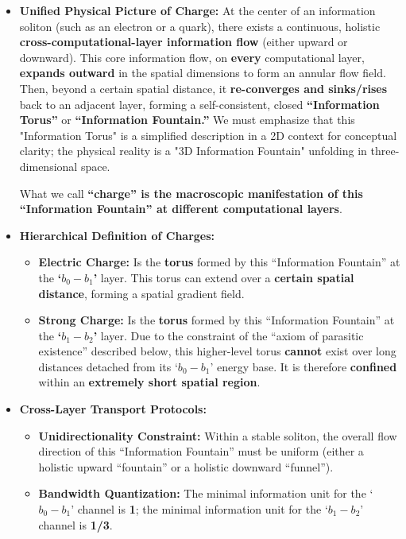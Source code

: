 \documentclass[11pt, a4paper]{article}
\begin{document}
\begin{itemize}
    \item \textbf{Unified Physical Picture of Charge:}  
    At the center of an information soliton (such as an electron or a quark), there exists a continuous, holistic \textbf{cross-computational-layer information flow} (either upward or downward). This core information flow, on \textbf{every} computational layer, \textbf{expands outward} in the spatial dimensions to form an annular flow field. Then, beyond a certain spatial distance, it \textbf{re-converges and sinks/rises} back to an adjacent layer, forming a self-consistent, closed \textbf{``Information Torus''} or \textbf{``Information Fountain.''} We must emphasize that this "Information Torus" is a simplified description in a 2D context for conceptual clarity; the physical reality is a "3D Information Fountain" unfolding in three-dimensional space.
    
    What we call \textbf{``charge'' is the macroscopic manifestation of this ``Information Fountain'' at different computational layers}.
    
    \item \textbf{Hierarchical Definition of Charges:}
    \begin{itemize}
        \item \textbf{Electric Charge:} Is the \textbf{torus} formed by this ``Information Fountain'' at the \textbf{`$b_0-b_1$'} layer. This torus can extend over a \textbf{certain spatial distance}, forming a spatial gradient field.
    
        \item \textbf{Strong Charge:} Is the \textbf{torus} formed by this ``Information Fountain'' at the \textbf{`$b_1-b_2$'} layer. Due to the constraint of the ``axiom of parasitic existence'' described below, this higher-level torus \textbf{cannot} exist over long distances detached from its `$b_0-b_1$' energy base. It is therefore \textbf{confined} within an \textbf{extremely short spatial region}.
    \end{itemize}
    
    \item \textbf{Cross-Layer Transport Protocols:}
    \begin{itemize}
        \item \textbf{Unidirectionality Constraint:} Within a stable soliton, the overall flow direction of this ``Information Fountain'' must be uniform (either a holistic upward ``fountain'' or a holistic downward ``funnel'').
        \item \textbf{Bandwidth Quantization:} The minimal information unit for the `$b_0-b_1$' channel is \textbf{1}; the minimal information unit for the `$b_1-b_2$' channel is \textbf{1/3}.
    \end{itemize}
\end{itemize}
\end{document}
